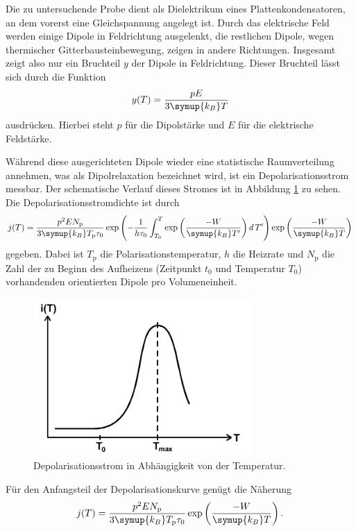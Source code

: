 Die zu untersuchende Probe dient als Dielektrikum eines Plattenkondensatoren, an dem vorerst eine Gleichspannung angelegt ist.
Durch das elektrische Feld werden einige Dipole in Feldrichtung ausgelenkt, die restlichen Dipole, wegen thermischer Gitterbausteinbewegung, zeigen
in andere Richtungen. Insgesamt zeigt also nur ein Bruchteil $y$ der Dipole in Feldrichtung.
Dieser Bruchteil lässt sich durch die Funktion
\begin{equation}
    y(T)=\frac{pE}{3\symup{k_B}T}
\end{equation}
ausdrücken.
Hierbei steht $p$ für die Dipolstärke und $E$ für die elektrische Feldstärke.

Während diese ausgerichteten Dipole wieder eine statistische Raumverteilung annehmen, was als Dipolrelaxation bezeichnet wird, ist ein Depolarisationsstrom messbar.
Der schematische Verlauf dieses Stromes ist in Abbildung \ref{fig:Strom} zu sehen.
Die Depolarisationsstromdichte ist durch
\begin{equation}
\label{eqn:Stromdichte}
    j(T)=\frac{p^2 E N_\text{p}}{3 \symup{k_B} T_\text{p}\tau_0}\exp\left(-\frac{1}{h\tau_0}\int_{T_0}^{T}\exp\left(\frac{-W}{\symup{k_B}T'}\right)d\,T'\right)\exp\left(\frac{-W}{\symup{k_B}T}\right)
\end{equation}
gegeben.
Dabei ist $T_\text{p}$ die Polarisationstemperatur, $h$ die Heizrate und $N_\text{p}$ die Zahl der zu Beginn des Aufheizens (Zeitpunkt $t_0$ und Temperatur $T_0$) vorhandenden orientierten Dipole pro Volumeneinheit.
\begin{figure}[htb]
    \centering
    \includegraphics[height=6cm]{pics/Strom.png}
    \caption{Depolarisationsstrom in Abhängigkeit von der Temperatur. \cite{anleitung}}
    \label{fig:Strom}
\end{figure}
\FloatBarrier
Für den Anfangsteil der Depolarisationskurve genügt die Näherung
\begin{equation}
    j(T)=\frac{p^2 E N_\text{p}}{3 \symup{k_B} T_\text{p}\tau_0}\exp\left(\frac{-W}{\symup{k_B}T}\right).    
\end{equation}
